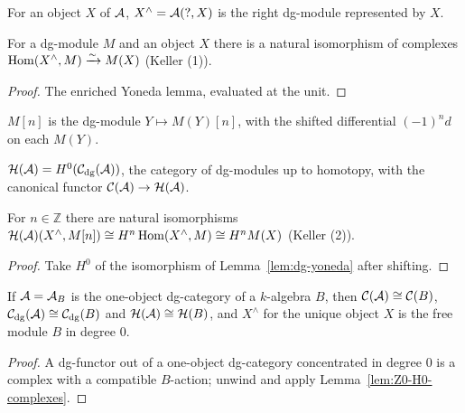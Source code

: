 \begin{definition}
\label{def:dg-representable}
For an object $X$ of $\mathcal{A}$, $X^{\wedge} = \mathcal{A}(?,X)$ is the right dg-module represented by $X$.
\end{definition}

\begin{lemma}[dg-Yoneda]
\label{lem:dg-yoneda}
For a dg-module $M$ and an object $X$ there is a natural isomorphism of complexes
$\operatorname{Hom}(X^{\wedge}, M) \xrightarrow{\sim} M(X)$ (Keller (1)).
\end{lemma}
\begin{proof}
The enriched Yoneda lemma, evaluated at the unit.
\end{proof}

\begin{definition}
\label{def:dg-module-shift}
$M[n]$ is the dg-module $Y \mapsto M(Y)[n]$, with the shifted differential
$(-1)^n d$ on each $M(Y)$.
\end{definition}

\begin{definition}
\label{def:dg-module-homotopy-cat}
$\mathcal{H}(\mathcal{A}) = H^0(\mathcal{C}_{\mathrm{dg}}(\mathcal{A}))$, the category of dg-modules up to homotopy, with the
canonical functor $\mathcal{C}(\mathcal{A}) \to \mathcal{H}(\mathcal{A})$.
\end{definition}

\begin{lemma}
\label{lem:dg-homotopy-yoneda}
For $n \in \mathbb{Z}$ there are natural isomorphisms
$\mathcal{H}(\mathcal{A})(X^{\wedge}, M[n]) \cong H^n \operatorname{Hom}(X^{\wedge}, M) \cong H^n M(X)$ (Keller (2)).
\end{lemma}
\begin{proof}
Take $H^0$ of the isomorphism of Lemma~\ref{lem:dg-yoneda} after shifting.
\end{proof}

\begin{proposition}
\label{prop:dg-module-ring}
If $\mathcal{A} = \mathcal{A}_B$ is the one-object dg-category of a $k$-algebra $B$, then
$\mathcal{C}(\mathcal{A}) \cong \mathcal{C}(B)$, $\mathcal{C}_{\mathrm{dg}}(\mathcal{A}) \cong \mathcal{C}_{\mathrm{dg}}(B)$ and $\mathcal{H}(\mathcal{A}) \cong \mathcal{H}(B)$,
and $X^{\wedge}$ for the unique object $X$ is the free module $B$ in degree $0$.
\end{proposition}
\begin{proof}
A dg-functor out of a one-object dg-category concentrated in degree $0$ is a complex with a
compatible $B$-action; unwind and apply Lemma~\ref{lem:Z0-H0-complexes}.
\end{proof}

